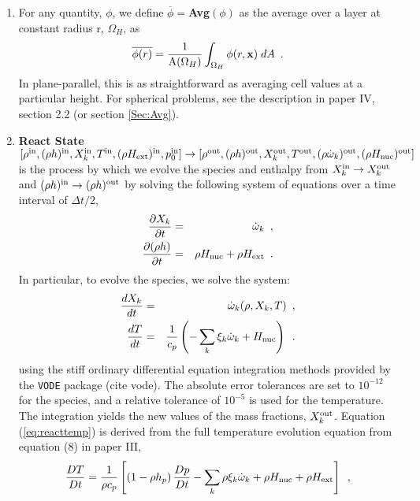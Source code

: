\begin{enumerate}

\item For any quantity, $\phi$, we define $\overline{\phi} = ${\bf Avg}$(\phi)$
as the average over a layer at constant radius r, $\Omega_H$, as
\begin{equation}
\overline{\phi(r)}
= \frac{1}{\mathrm{A}(\Omega_H)}\int_{\Omega_H} \phi(r,{\bf x}) \; dA \enskip .
\end{equation}
In plane-parallel, this is as straightforward as averaging cell values at 
a particular height.  For spherical problems, see the description in 
paper IV, section 2.2 (or section \ref{Sec:Avg}).

\item {\bf React State}$[\rho^{\mathrm{in}},(\rho h)^{\mathrm{in}},X_k^{\mathrm{in}},T^{\mathrm{in}}, (\rho{H_{\rm ext}})^{\mathrm{in}}, 
p_0^{\mathrm{in}}]\rightarrow [\rho^{\mathrm{out}}, (\rho h)^{\mathrm{out}}, X_k^{\mathrm{out}}, T^{\mathrm{out}}, 
(\rho \dot{\omega}_k)^{\mathrm{out}}, (\rho{H_{\rm nuc}})^{\mathrm{out}}]$ \\
is the process by which we evolve the species and enthalpy from 
$X_k^{\mathrm{in}} \rightarrow X_k^{\mathrm{out}}$ 
and $(\rho h)^{\mathrm{in}} \rightarrow (\rho h)^{\mathrm{out}}$ by solving the following 
system of equations over a time interval of  $\Delta t/2$,
\begin{eqnarray}
\frac{\partial X_k}{\partial t} &=& \dot{\omega}_k\enskip,\\
\frac{\partial (\rho h)}{\partial t} &=& \rho {H_{\rm nuc}} + \rho {H_{\rm ext}}\enskip .
\end{eqnarray}
  In particular, to evolve the species, we solve the system:
\begin{eqnarray}
\frac{dX_k}{dt} &=& \dot{\omega}_k(\rho,X_k,T)\enskip, \\
\frac{dT}{dt} &=&\frac{1}{c_p} \left ( -\sum_k \xi_k  \dot{\omega}_k  + {H_{\rm nuc}} \right )
\enskip. \label{eq:reacttemp}
\end{eqnarray}
using the stiff ordinary differential equation integration methods
provided by the {\tt VODE} package (cite vode).  The absolute error
tolerances are set to $10^{-12}$ for the species, and a relative
tolerance of $10^{-5}$ is used for the temperature.  The integration
yields the new values of the mass fractions, $X_k^{\mathrm{out}}$.  Equation
(\ref{eq:reacttemp}) is derived from the full temperature evolution equation
from equation (8) in paper III,
\begin{equation}
\label{eq:tempenthalpy}
\frac{DT}{Dt} = \frac{1}{\rho c_p} \left[ \left(1 - \rho h_p\right) \frac{D p}{D t}
 - \sum_k \rho \xi_k {\omegadot}_k 
 + \rho \Hnuc + \rho \Hext \right] \enskip , 

\end{equation}
\end{enumerate}
